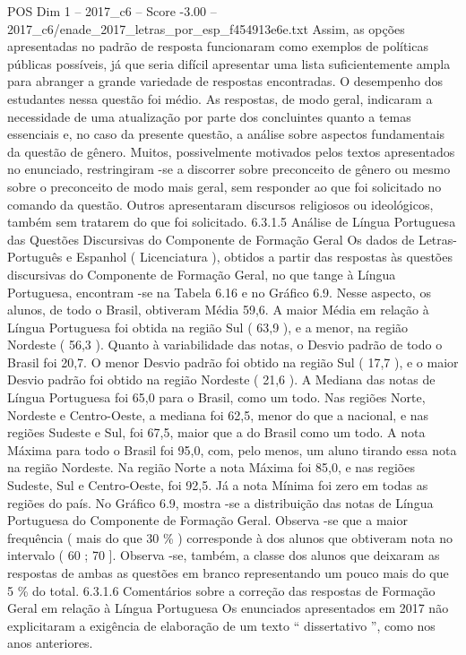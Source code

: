 \begin{textsample}{POS Dim 1 – 2017\_c6 – Score -3.00 – 2017\_c6/enade\_2017\_letras\_por\_esp\_f454913e6e.txt}
Assim, as opções apresentadas no padrão de resposta funcionaram como exemplos de políticas públicas possíveis, já que seria difícil apresentar uma lista suficientemente ampla para abranger a grande variedade de respostas encontradas.
O desempenho dos estudantes nessa questão foi médio.
As respostas, de modo geral, indicaram a necessidade de uma atualização por parte dos concluintes quanto a temas essenciais e, no caso da presente questão, a análise sobre aspectos fundamentais da questão de gênero.
Muitos, possivelmente motivados pelos textos apresentados no enunciado, restringiram -se a discorrer sobre preconceito de gênero ou mesmo sobre o preconceito de modo mais geral, sem responder ao que foi solicitado no comando da questão.
Outros apresentaram discursos religiosos ou ideológicos, também sem tratarem do que foi solicitado. 6.3.1.5 Análise de Língua Portuguesa das Questões Discursivas do Componente de Formação Geral Os dados de Letras-Português e Espanhol ( Licenciatura ), obtidos a partir das respostas às questões discursivas do Componente de Formação Geral, no que tange à Língua Portuguesa, encontram -se na Tabela 6.16 e no Gráfico 6.9.
Nesse aspecto, os alunos, de todo o Brasil, obtiveram Média 59,6.
A maior Média em relação à Língua Portuguesa foi obtida na região Sul ( 63,9 ), e a menor, na região Nordeste ( 56,3 ).
Quanto à variabilidade das notas, o Desvio padrão de todo o Brasil foi 20,7.
O menor Desvio padrão foi obtido na região Sul ( 17,7 ), e o maior Desvio padrão foi obtido na região Nordeste ( 21,6 ).
A Mediana das notas de Língua Portuguesa foi 65,0 para o Brasil, como um todo.
Nas regiões Norte, Nordeste e Centro-Oeste, a mediana foi 62,5, menor do que a nacional, e nas regiões Sudeste e Sul, foi 67,5, maior que a do Brasil como um todo.
A nota Máxima para todo o Brasil foi 95,0, com, pelo menos, um aluno tirando essa nota na região Nordeste.
Na região Norte a nota Máxima foi 85,0, e nas regiões Sudeste, Sul e Centro-Oeste, foi 92,5.
Já a nota Mínima foi zero em todas as regiões do país.
No Gráfico 6.9, mostra -se a distribuição das notas de Língua Portuguesa do Componente de Formação Geral.
Observa -se que a maior frequência ( mais do que 30 \% ) corresponde à dos alunos que obtiveram nota no intervalo ( 60 ; 70 ].
Observa -se, também, a classe dos alunos que deixaram as respostas de ambas as questões em branco representando um pouco mais do que 5 \% do total. 6.3.1.6 Comentários sobre a correção das respostas de Formação Geral em relação à Língua Portuguesa Os enunciados apresentados em 2017 não explicitaram a exigência de elaboração de um texto “ dissertativo ”, como nos anos anteriores.

\end{textsample}
